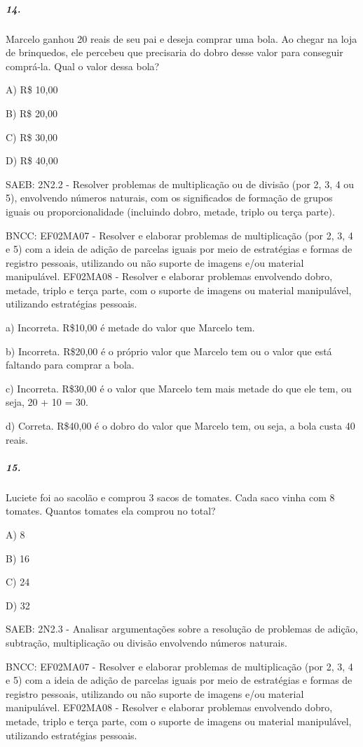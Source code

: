 \subparagraph{14. }\label{section-128}

Marcelo ganhou 20 reais de seu pai e deseja comprar uma bola. Ao chegar
na loja de brinquedos, ele percebeu que precisaria do dobro desse valor
para conseguir comprá-la. Qual o valor dessa bola?

A) R\$ 10,00

B) R\$ 20,00

C) R\$ 30,00

D) R\$ 40,00

SAEB: 2N2.2 - Resolver problemas de multiplicação ou de divisão (por 2,
3, 4 ou 5), envolvendo números naturais, com os significados de formação
de grupos iguais ou proporcionalidade (incluindo dobro, metade, triplo
ou terça parte).

BNCC: EF02MA07 - Resolver e elaborar problemas de multiplicação (por 2,
3, 4 e 5) com a ideia de adição de parcelas iguais por meio de
estratégias e formas de registro pessoais, utilizando ou não suporte de
imagens e/ou material manipulável. EF02MA08 - Resolver e elaborar
problemas envolvendo dobro, metade, triplo e terça parte, com o suporte
de imagens ou material manipulável, utilizando estratégias pessoais.

a) Incorreta. R\$10,00 é metade do valor que Marcelo tem.

b) Incorreta. R\$20,00 é o próprio valor que Marcelo tem ou o valor que
está faltando para comprar a bola.

c) Incorreta. R\$30,00 é o valor que Marcelo tem mais metade do que ele
tem, ou seja, 20 + 10 = 30.

d) Correta. R\$40,00 é o dobro do valor que Marcelo tem, ou seja, a bola
custa 40 reais.

\subparagraph{15. }\label{section-129}

Luciete foi ao sacolão e comprou 3 sacos de tomates. Cada saco vinha com
8 tomates. Quantos tomates ela comprou no total?

A) 8

B) 16

C) 24

D) 32

SAEB: 2N2.3 - Analisar argumentações sobre a resolução de problemas de
adição, subtração, multiplicação ou divisão envolvendo números naturais.

BNCC: EF02MA07 - Resolver e elaborar problemas de multiplicação (por 2,
3, 4 e 5) com a ideia de adição de parcelas iguais por meio de
estratégias e formas de registro pessoais, utilizando ou não suporte de
imagens e/ou material manipulável. EF02MA08 - Resolver e elaborar
problemas envolvendo dobro, metade, triplo e terça parte, com o suporte
de imagens ou material manipulável, utilizando estratégias pessoais.


